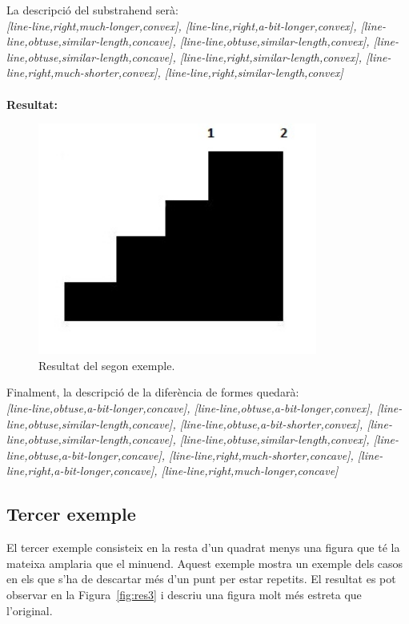 \documentclass{article}
\begin{document}
La descripció del substrahend serà:
\\
\emph {[line-line,right,much-longer,convex], [line-line,right,a-bit-longer,convex], [line-line,obtuse,similar-length,concave], [line-line,obtuse,similar-length,convex], [line-line,obtuse,similar-length,concave], [line-line,right,similar-length,convex], [line-line,right,much-shorter,convex], [line-line,right,similar-length,convex]}
\\
\\
{\bf Resultat:}
\begin{figure}[!h]
\centering
\includegraphics[width=260pt]{images/res2.jpg}
\caption {Resultat del segon exemple.}
\label {fig:res2}
\end{figure}

Finalment, la descripció de la diferència de formes quedarà:
\\
\emph {[line-line,obtuse,a-bit-longer,concave], [line-line,obtuse,a-bit-longer,convex], [line-line,obtuse,similar-length,concave], [line-line,obtuse,a-bit-shorter,convex], [line-line,obtuse,similar-length,concave], [line-line,obtuse,similar-length,convex], [line-line,obtuse,a-bit-longer,concave], [line-line,right,much-shorter,concave], [line-line,right,a-bit-longer,concave], [line-line,right,much-longer,concave]}


\subsection{Tercer exemple}
El tercer exemple consisteix en la resta d'un quadrat menys una figura que té la mateixa amplaria que el minuend.
Aquest exemple mostra un exemple dels casos en els que s'ha de descartar més d'un punt per estar repetits.
El resultat es pot observar en la Figura~\ref{fig:res3} i descriu una figura molt més estreta que l'original.
\\
\\
\end{document}
